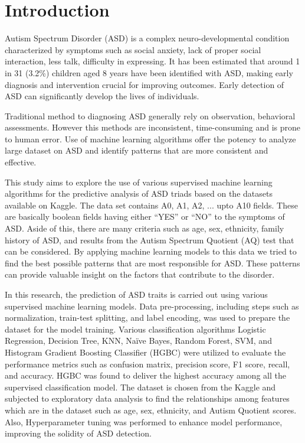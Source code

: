 \documentclass[pdflatex,sn-nature]{sn-jnl}
\theoremstyle{thmstyleone}%
\theoremstyle{thmstyletwo}%
\theoremstyle{thmstylethree}%
\begin{document}
\section{Introduction}\label{sec1}

Autism Spectrum Disorder (ASD) is a complex neuro-developmental condition characterized by symptoms such as social anxiety, lack of proper social interaction, less talk, difficulty in expressing. It has been estimated that around 1 in 31 (3.2\%) children aged 8 years have been identified with ASD\cite{1in31}, making early diagnosis and intervention crucial for improving outcomes. Early detection of ASD can significantly develop the lives of individuals.

Traditional method to diagnosing ASD generally rely on observation, behavioral assessments\cite{ini3}. However this methods are inconsistent, time-consuming and is prone to human error. Use of machine learning algorithms offer the potency to analyze large dataset on ASD and identify patterns that are more consistent and effective.

 This study aims to explore the use of various supervised machine learning algorithms for the predictive analysis of ASD triads based on the datasets available on Kaggle. The data set contains A0, A1, A2, ... upto A10 fields. These are basically boolean fields having either \enquote{YES} or \enquote{NO} to the symptoms of ASD. Aside of this, there are many criteria such as age, sex, ethnicity, family history of ASD, and results from the Autism Spectrum Quotient (AQ) test that can be considered. By applying machine learning models to this data we tried to find the best possible patterns that are most responsible for ASD. These patterns can provide valuable insight on the factors that contribute to the disorder\cite{bib12}.

 In this research, the prediction of ASD traits is carried out using various supervised machine learning models. Data pre-processing, including steps such as normalization, train-test splitting, and label encoding, was used to prepare the dataset for the model training. Various classification algorithms Logistic Regression, Decision Tree, KNN, Naïve Bayes, Random Forest, SVM, and Histogram Gradient Boosting Classifier (HGBC) were utilized to evaluate the performance metrics such as confusion matrix, precision score, F1 score, recall, and accuracy\cite{bib14}. HGBC was found to deliver the highest accuracy among all the supervised classification model. The dataset is chosen from the Kaggle and subjected to exploratory data analysis to find the relationships among features which are in the dataset such as age, sex, ethnicity, and Autism Quotient scores. Also, Hyperparameter tuning was performed to enhance model performance, improving the solidity of ASD detection.
\end{document}
